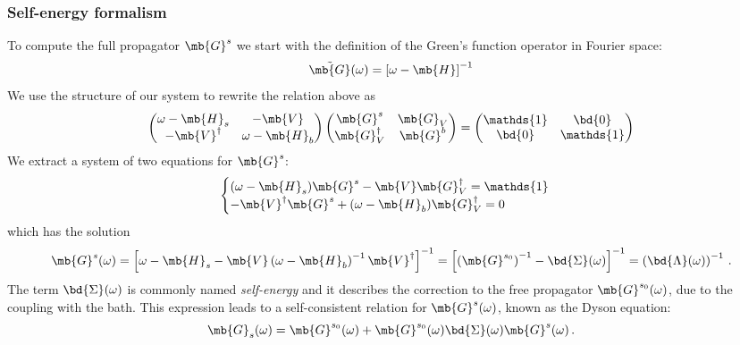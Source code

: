 \subsubsection*{Self-energy formalism}
To compute the full propagator $\mb{G}^{s}$ we start with the definition of the Green's function operator in Fourier space:
$$
\Tilde{\mb{G}}(\omega) = \left[\omega - \mb{H} \right]^{-1}
$$
We use the structure of our system to rewrite the relation above as
\begin{equation*}
    \begin{pmatrix}
        \omega - \mb{H}_s & -\mb{V} \\
        -\mb{V}^\dagger & \omega-\mb{H}_b
    \end{pmatrix}
    \begin{pmatrix}
        \mb{G}^{s} & \mb{G}_V \\
        \mb{G}^\dagger_V & \mb{G}^b
    \end{pmatrix}
    =
    \begin{pmatrix}
        \mathds{1} & \bd{0} \\
        \bd{0} & \mathds{1}
    \end{pmatrix}
\end{equation*}
We extract a system of two equations for $\mb{G}^{s}$:
\begin{equation}
    \begin{cases}
        (\omega-\mb{H}_s)\mb{G}^s - \mb{V}\mb{G}^\dagger_V = \mathds{1}
        \\
        -\mb{V}^\dagger \mb{G}^s + (\omega-\mb{H}_b)\mb{G}^\dagger_V = 0
    \end{cases}
\end{equation}
which has the solution
\begin{equation}
    \mb{G}^s(\omega) = \left[ \omega - \mb{H}_s - \mb{V} \left(\omega-\mb{H}_b\right)^{-1}\mb{V}^\dagger \right]^{-1} =
     \left[\left(\mb{G}^{s_0}\right)^{-1} - \bd{\Sigma}(\omega) \right]^{-1}
     = \left(\bd{\Lambda}(\omega)\right)^{-1} \,.
     \label{eq:dysonInverse}
\end{equation}
The term $\bd{\Sigma}(\omega)$ is commonly named \textit{self-energy} and it describes the correction to the free propagator $\mb{G}^{s_0}(\omega)$, due to the coupling with the bath.
This expression leads to a self-consistent relation for $\mb{G}^s(\omega)$, known as the Dyson equation:
\begin{equation}
    \mb{G}_s(\omega) = \mb{G}^{s_0}(\omega) + \mb{G}^{s_0}(\omega) \bd{\Sigma}(\omega)\mb{G}^s(\omega) \,.
    \label{eq:dyson}
\end{equation}
